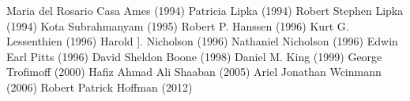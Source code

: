 \documentclass[12pt]{article}
\begin{document}
\begin{multicols}{2}
Maria del Rosario Casa Ames (1994)\newline
Patricia Lipka (1994)\newline
Robert Stephen Lipka (1994)\newline
Kota Subrahmanyam (1995)\newline
Robert P. Hanssen (1996)\newline
Kurt G. Lessenthien (1996)\newline
Harold ]. Nicholson (1996)\newline
Nathaniel Nicholson (1996)\newline
Edwin Earl Pitts (1996)\newline
David Sheldon Boone (1998)\newline
Daniel M. King (1999)\newline
George Trofimoff (2000)\newline
Hafiz Ahmad Ali Shaaban (2005)\newline
Ariel Jonathan Wcinmann (2006)\newline
Robert Patrick Hoffman (2012)
\end{multicols}


\newpage
\printbibliography
\end{document}
